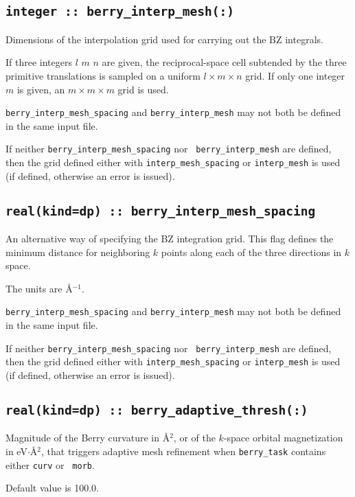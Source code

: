\subsection[berry\_interp\_mesh]{\tt integer :: berry\_interp\_mesh(:)}
Dimensions of the interpolation grid used for carrying out the BZ
integrals.

If three integers $l$ $m$ $n$ are given, the reciprocal-space cell
subtended by the three primitive translations is sampled on a uniform
$l\times m\times n$ grid.  If only one integer $m$ is given, an
$m\times m\times m$ grid is used.

{\tt berry\_interp\_mesh\_spacing} and {\tt berry\_interp\_mesh} may not
both be defined in the same input file.

If neither {\tt berry\_interp\_mesh\_spacing} nor {\tt
  berry\_interp\_mesh} are defined, then the grid defined either with
{\tt interp\_mesh\_spacing} or {\tt interp\_mesh} is used (if defined,
otherwise an error is issued).

\subsection[berry\_interp\_mesh\_spacing]{\tt real(kind=dp) :: berry\_interp\_mesh\_spacing}
An alternative way of specifying the BZ integration grid. This flag
defines the minimum distance for neighboring $k$ points along each of
the three directions in $k$ space.


The units are \AA$^{-1}$.

{\tt berry\_interp\_mesh\_spacing} and {\tt berry\_interp\_mesh} may
not both be defined in the same input file.

If neither {\tt berry\_interp\_mesh\_spacing} nor {\tt
  berry\_interp\_mesh} are defined, then the grid defined either with
{\tt interp\_mesh\_spacing} or {\tt interp\_mesh} is used (if defined,
otherwise an error is issued).


\subsection[berry\_adaptive\_thresh]{\tt real(kind=dp) :: berry\_adaptive\_thresh(:)}

Magnitude of the Berry curvature in \AA$^2$, or of the $k$-space
orbital magnetization in eV$\cdot$\AA$^2$, that triggers adaptive mesh
refinement when {\tt berry\_task} contains either {\tt curv} or {\tt
  morb}.

Default value is 100.0.

